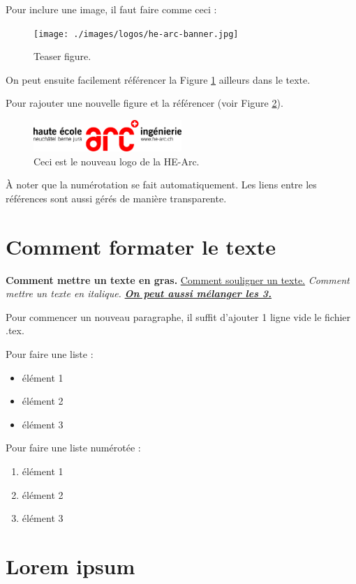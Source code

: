Pour inclure une image, il faut faire comme ceci :
\begin{figure}[h]
  \centering
  \texttt{[image: ./images/logos/he-arc-banner.jpg]}
  \caption{Teaser figure.}
  \label{Fig_teaser}
\end{figure}

On peut ensuite facilement référencer la Figure \ref{Fig_teaser} ailleurs dans le texte.

Pour rajouter une nouvelle figure et la référencer (voir Figure \ref{Fig_exemple}).
\begin{figure}[h]
    \centering
    \includegraphics[width=0.5\textwidth]{./images/logos/he-arc-logo.png}
    \caption{Ceci est le nouveau logo de la HE-Arc.}
    \label{Fig_exemple}
\end{figure}

À noter que la numérotation se fait automatiquement.
Les liens entre les références sont aussi gérés de manière transparente.

\section{Comment formater le texte}
\textbf{Comment mettre un texte en gras.}
\underline{Comment souligner un texte.} 
\textit{Comment mettre un texte en italique.}
\underline{\textbf{\textit{On peut aussi mélanger les 3.}}}

Pour commencer un nouveau paragraphe, il suffit d'ajouter 1 ligne vide le fichier .tex.

Pour faire une liste :
\begin{itemize}
    \item élément 1
    \item élément 2
    \item élément 3
\end{itemize}

Pour faire une liste numérotée :
\begin{enumerate}
    \item élément 1
    \item élément 2
    \item élément 3
\end{enumerate}

\section{Lorem ipsum}
\lipsum[1-1] %
